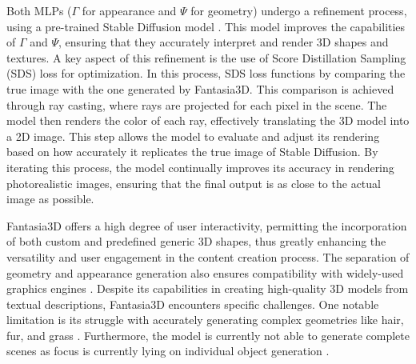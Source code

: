 Both MLPs (\(\Gamma\) for appearance and \(\Psi\) for geometry) undergo a refinement process, using a pre-trained Stable Diffusion model \citep{rombachStableDiffusion}. This model improves the capabilities of \(\Gamma\) and \(\Psi\), ensuring that they accurately interpret and render 3D shapes and textures. A key aspect of this refinement is the use of Score Distillation Sampling (SDS) loss \citep{mildenhallNERF} for optimization. In this process, SDS loss functions by comparing the true image with the one generated by Fantasia3D. This comparison is achieved through ray casting, where rays are projected for each pixel in the scene. The model then renders the color of each ray, effectively translating the 3D model into a 2D image. This step allows the model to evaluate and adjust its rendering based on how accurately it replicates the true image of Stable Diffusion. By iterating this process, the model continually improves its accuracy in rendering photorealistic images, ensuring that the final output is as close to the actual image as possible.

Fantasia3D offers a high degree of user interactivity, permitting the incorporation of both custom and predefined generic 3D shapes, thus greatly enhancing the versatility and user engagement in the content creation process. The separation of geometry and appearance generation also ensures compatibility with widely-used graphics engines \citep{chen2023fantasia3d}. Despite its capabilities in creating high-quality 3D models from textual descriptions, Fantasia3D encounters specific challenges. One notable limitation is its struggle with accurately generating complex geometries like hair, fur, and grass \citep{chen2023fantasia3d}. Furthermore, the model is currently not able to generate complete scenes as focus is currently lying on individual object generation \citep{chen2023fantasia3d}.
